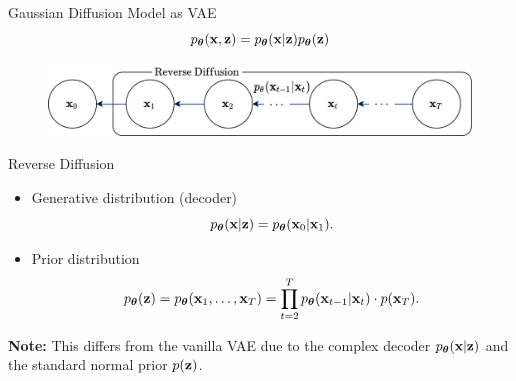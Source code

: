 \documentclass{beamer}
\begin{document}
\begin{frame}{Gaussian Diffusion Model as VAE}
    \[
        p_{\boldsymbol{\theta}}(\mathbf{x}, \mathbf{z}) = p_{\boldsymbol{\theta}}(\mathbf{x} | \mathbf{z}) p_{\boldsymbol{\theta}}(\mathbf{z})
    \]    
    \eqpause
    \vspace{-0.5cm}
    \begin{figure}
        \includegraphics[width=0.8\linewidth]{figs/diffusion_pgm_reverse}
    \end{figure}
    \eqpause
    \vspace{-0.2cm}
    \begin{block}{Reverse Diffusion}
        \begin{itemize}
            \item Generative distribution (decoder)
            \[
                p_{\boldsymbol{\theta}}(\mathbf{x} | \mathbf{z}) = p_{\boldsymbol{\theta}}(\mathbf{x}_0 | \mathbf{x}_1).
            \]
            \vspace{-0.7cm}
            \eqpause
            \item Prior distribution
            \vspace{-0.3cm}
            \[
                p_{\boldsymbol{\theta}}(\mathbf{z}) = p_{\boldsymbol{\theta}}(\mathbf{x}_1, \dots, \mathbf{x}_T) = \prod_{t=2}^T p_{\boldsymbol{\theta}}(\mathbf{x}_{t - 1} | \mathbf{x}_t)  \cdot p(\mathbf{x}_T).
            \]
            \vspace{-0.3cm}
        \end{itemize}
        \eqpause
        \textbf{Note:} This differs from the vanilla VAE due to the complex decoder $p_{\boldsymbol{\theta}}(\mathbf{x} | \mathbf{z})$ and the standard normal prior $p(\mathbf{z})$.
    \end{block}
\end{frame}
\end{document}
